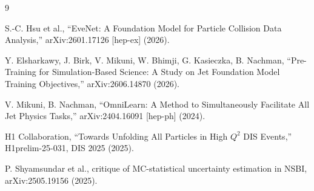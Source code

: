 \documentclass[11pt]{article}
\begin{document}
\begin{thebibliography}{9}\small

S.-C. Hsu et al., ``EveNet: A Foundation Model for Particle Collision Data Analysis,''
arXiv:2601.17126 [hep-ex] (2026).

Y. Elsharkawy, J. Birk, V. Mikuni, W. Bhimji, G. Kasieczka, B. Nachman,
``Pre-Training for Simulation-Based Science: A Study on Jet Foundation Model Training
Objectives,'' arXiv:2606.14870 (2026).

V. Mikuni, B. Nachman, ``OmniLearn: A Method to Simultaneously Facilitate All Jet Physics
Tasks,'' arXiv:2404.16091 [hep-ph] (2024).

H1 Collaboration, ``Towards Unfolding All Particles in High $Q^2$ DIS Events,''
H1prelim-25-031, DIS 2025 (2025).

P. Shyamsundar et al., critique of MC-statistical uncertainty estimation in NSBI,
arXiv:2505.19156 (2025).

\end{thebibliography}
\end{document}

